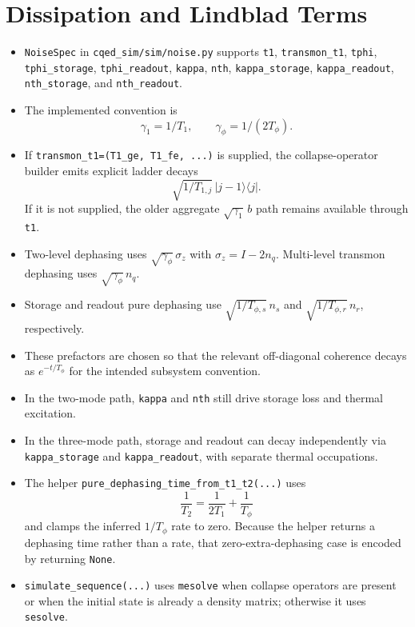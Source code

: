 \documentclass[11pt]{article}
\begin{document}
\section{Dissipation and Lindblad Terms}
\begin{itemize}[leftmargin=1.5em]
  \item \texttt{NoiseSpec} in \texttt{cqed\_sim/sim/noise.py} supports
  \texttt{t1}, \texttt{transmon\_t1}, \texttt{tphi}, \texttt{tphi\_storage},
  \texttt{tphi\_readout}, \texttt{kappa}, \texttt{nth},
  \texttt{kappa\_storage}, \texttt{kappa\_readout}, \texttt{nth\_storage}, and
  \texttt{nth\_readout}.
  \item The implemented convention is
  \[
  \gamma_1 = 1/T_1,
  \qquad
  \gamma_\phi = 1/(2 T_\phi).
  \]
  \item If \texttt{transmon\_t1=(T1\_ge, T1\_fe, ...)} is supplied, the
  collapse-operator builder emits explicit ladder decays
  \[
  \sqrt{1/T_{1,j}}\,|j-1\rangle\langle j|.
  \]
  If it is not supplied, the older aggregate \(\sqrt{\gamma_1}\,b\) path remains
  available through \texttt{t1}.
  \item Two-level dephasing uses \(\sqrt{\gamma_\phi}\,\sigma_z\) with
  \(\sigma_z = I - 2 n_q\). Multi-level transmon dephasing uses
  \(\sqrt{\gamma_\phi}\,n_q\).
  \item Storage and readout pure dephasing use
  \(\sqrt{1/T_{\phi,s}}\,n_s\) and \(\sqrt{1/T_{\phi,r}}\,n_r\), respectively.
  \item These prefactors are chosen so that the relevant off-diagonal coherence
  decays as \(e^{-t/T_\phi}\) for the intended subsystem convention.
  \item In the two-mode path, \texttt{kappa} and \texttt{nth} still drive storage
  loss and thermal excitation.
  \item In the three-mode path, storage and readout can decay independently via
  \texttt{kappa\_storage} and \texttt{kappa\_readout}, with separate thermal occupations.
  \item The helper \texttt{pure\_dephasing\_time\_from\_t1\_t2(...)} uses
  \[
  \frac{1}{T_2} = \frac{1}{2T_1} + \frac{1}{T_\phi}
  \]
  and clamps the inferred \(1/T_\phi\) rate to zero. Because the helper returns a
  dephasing time rather than a rate, that zero-extra-dephasing case is encoded by
  returning \texttt{None}.
  \item \texttt{simulate\_sequence(...)} uses \texttt{mesolve} when collapse
  operators are present or when the initial state is already a density matrix;
  otherwise it uses \texttt{sesolve}.
\end{itemize}
\end{document}
